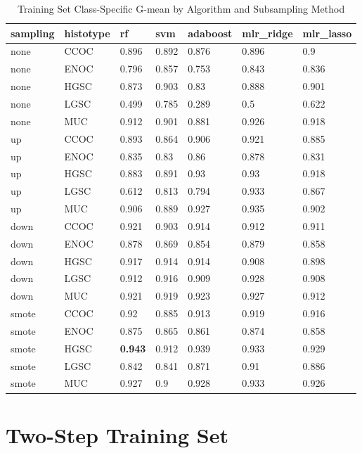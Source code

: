 \documentclass[
]{report}
\begin{document}
\begin{table}

\caption{\label{tab:train-gmean-class-table}Training Set Class-Specific G-mean by Algorithm and Subsampling Method}
\centering
\begin{tabular}[t]{l|l|l|l|l|l|l}
\hline
sampling & histotype & rf & svm & adaboost & mlr\_ridge & mlr\_lasso\\
\hline
none & CCOC & 0.896 & 0.892 & 0.876 & 0.896 & 0.9\\
\hline
none & ENOC & 0.796 & 0.857 & 0.753 & 0.843 & 0.836\\
\hline
none & HGSC & 0.873 & 0.903 & 0.83 & 0.888 & 0.901\\
\hline
none & LGSC & 0.499 & 0.785 & 0.289 & 0.5 & 0.622\\
\hline
none & MUC & 0.912 & 0.901 & 0.881 & 0.926 & 0.918\\
\hline
up & CCOC & 0.893 & 0.864 & 0.906 & 0.921 & 0.885\\
\hline
up & ENOC & 0.835 & 0.83 & 0.86 & 0.878 & 0.831\\
\hline
up & HGSC & 0.883 & 0.891 & 0.93 & 0.93 & 0.918\\
\hline
up & LGSC & 0.612 & 0.813 & 0.794 & 0.933 & 0.867\\
\hline
up & MUC & 0.906 & 0.889 & 0.927 & 0.935 & 0.902\\
\hline
down & CCOC & 0.921 & 0.903 & 0.914 & 0.912 & 0.911\\
\hline
down & ENOC & 0.878 & 0.869 & 0.854 & 0.879 & 0.858\\
\hline
down & HGSC & 0.917 & 0.914 & 0.914 & 0.908 & 0.898\\
\hline
down & LGSC & 0.912 & 0.916 & 0.909 & 0.928 & 0.908\\
\hline
down & MUC & 0.921 & 0.919 & 0.923 & 0.927 & 0.912\\
\hline
smote & CCOC & 0.92 & 0.885 & 0.913 & 0.919 & 0.916\\
\hline
smote & ENOC & 0.875 & 0.865 & 0.861 & 0.874 & 0.858\\
\hline
smote & HGSC & \textbf{0.943} & 0.912 & 0.939 & 0.933 & 0.929\\
\hline
smote & LGSC & 0.842 & 0.841 & 0.871 & 0.91 & 0.886\\
\hline
smote & MUC & 0.927 & 0.9 & 0.928 & 0.933 & 0.926\\
\hline
\end{tabular}
\end{table}

\hypertarget{two-step-training-set}{%
\section{Two-Step Training Set}\label{two-step-training-set}}
\end{document}
